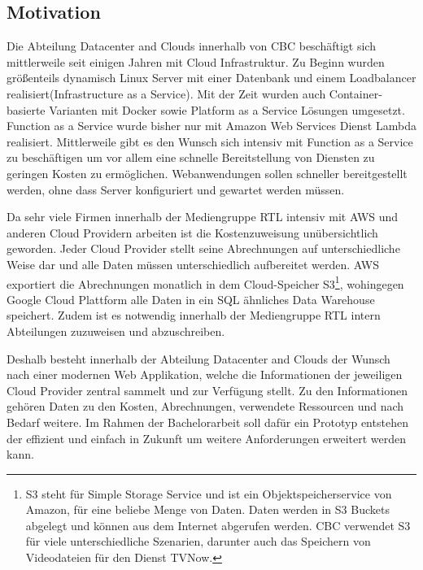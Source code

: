 \subsection{Motivation}
\label{Motivation}
Die Abteilung Datacenter and Clouds innerhalb von CBC beschäftigt sich mittlerweile seit einigen Jahren mit Cloud Infrastruktur.
Zu Beginn wurden größenteils dynamisch Linux Server mit einer Datenbank und einem Loadbalancer realisiert(Infrastructure as a Service).
Mit der Zeit wurden auch Container-basierte Varianten mit Docker sowie Platform as a Service Lösungen umgesetzt.
Function as a Service wurde bisher nur mit Amazon Web Services Dienst Lambda realisiert.
Mittlerweile gibt es den Wunsch sich intensiv mit Function as a Service zu beschäftigen um vor allem eine schnelle Bereitstellung von Diensten zu geringen Kosten zu ermöglichen.
Webanwendungen sollen schneller bereitgestellt werden, ohne dass Server konfiguriert und gewartet werden müssen.

Da sehr viele Firmen innerhalb der Mediengruppe RTL intensiv mit AWS und anderen Cloud Providern arbeiten ist die Kostenzuweisung unübersichtlich geworden.
Jeder Cloud Provider stellt seine Abrechnungen auf unterschiedliche Weise dar und alle Daten müssen unterschiedlich aufbereitet werden.
AWS exportiert die Abrechnungen monatlich in dem Cloud-Speicher
S3\footnote{S3 steht für Simple Storage Service und ist ein Objektspeicherservice von Amazon, für eine beliebe Menge von Daten.
Daten werden in S3 Buckets abgelegt und können aus dem Internet abgerufen werden.
CBC verwendet S3 für viele unterschiedliche Szenarien, darunter auch das Speichern von Videodateien für den Dienst TVNow.   }, wohingegen Google Cloud Plattform alle Daten in ein SQL ähnliches Data Warehouse speichert.
Zudem ist es notwendig innerhalb der Mediengruppe RTL intern Abteilungen zuzuweisen und abzuschreiben.

Deshalb besteht innerhalb der Abteilung Datacenter and Clouds der Wunsch nach einer modernen Web Applikation, welche die Informationen der jeweiligen Cloud Provider zentral sammelt und zur Verfügung stellt.
Zu den Informationen gehören Daten zu den Kosten, Abrechnungen, verwendete Ressourcen und nach Bedarf weitere.
Im Rahmen der Bachelorarbeit soll dafür ein Prototyp entstehen der effizient und einfach in Zukunft um weitere Anforderungen erweitert werden kann.
